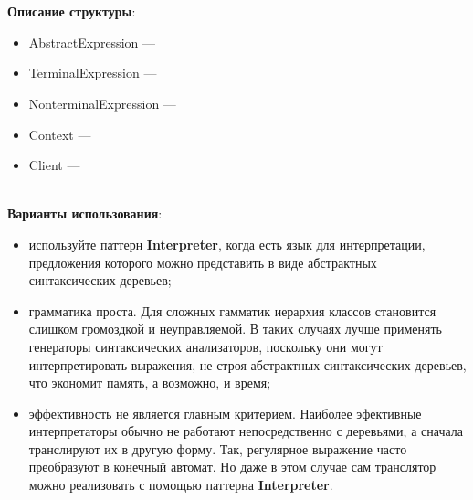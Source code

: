 \documentclass[a3paper,11pt]{report}
\def \ssboxSize {3cm}
\def \boxSize {7cm}
\renewcommand{\unidirectionalAssociation}[4]{
	\draw [umlcd style, ->, umlcdNS] (#1) -- (#4)
	node[near end, above]{#2}
	node[near end, below]{#3};
}
\begin{document}
\\\\
\textbf{Описание структуры}:
\begin{itemize}
\item AbstractExpression ---
\item TerminalExpression ---
\item NonterminalExpression ---
\item Context ---
\item Client ---
\end{itemize}

\large\textbf{\\Варианты использования}:
\begin{itemize}
\item используйте паттерн \textbf{Interpreter}, когда есть язык для интерпретации, предложения которого можно представить в виде абстрактных синтаксических деревьев;
\item грамматика проста. Для сложных гамматик иерархия классов становится слишком громоздкой и неуправляемой. В таких случаях лучше применять генераторы синтаксических анализаторов, поскольку они могут интерпретировать выражения, не строя абстрактных синтаксических деревьев, что экономит память, а возможно, и время;
\item эффективность не является главным критерием. Наиболее эфективные интерпретаторы обычно не работают непосредственно с деревьями, а сначала транслируют их в другую форму. Так, регулярное выражение часто преобразуют в конечный автомат. Но даже в этом случае сам транслятор можно реализовать с помощью паттерна \textbf{Interpreter}.
\end{itemize}
\end{document}
